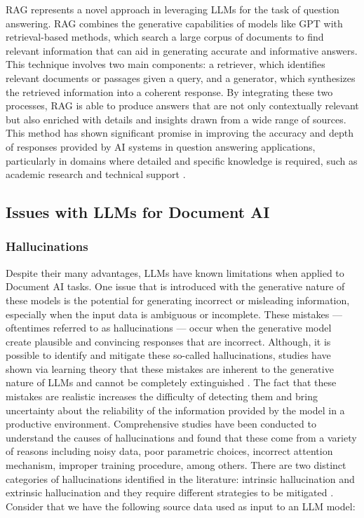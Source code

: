 \documentclass[english, 12pt, a4paper, elec, utf8, a-2b, online]{aaltothesis}
\begin{document}
\ac{RAG} represents a novel approach in leveraging \ac{LLM}s for the task of question answering.
\ac{RAG} combines the generative capabilities of models like GPT with retrieval-based methods, which search a large corpus of documents to find relevant information that can aid in generating accurate and informative answers.
This technique involves two main components: a retriever, which identifies relevant documents or passages given a query, and a generator, which synthesizes the retrieved information into a coherent response.
By integrating these two processes, RAG is able to produce answers that are not only contextually relevant but also enriched with details and insights drawn from a wide range of sources.
This method has shown significant promise in improving the accuracy and depth of responses provided by AI systems in question answering applications, particularly in domains where detailed and specific knowledge is required, such as academic research and technical support \cite{}.

\subsection{Issues with \ac{LLM}s for Document AI}

\subsubsection{Hallucinations}

Despite their many advantages, \ac{LLM}s have known limitations when applied to Document AI tasks.
One issue that is introduced with the generative nature of these models is the potential for generating incorrect or misleading information, especially when the input data is ambiguous or incomplete.
These mistakes --- oftentimes referred to as hallucinations --- occur when the generative model create plausible and convincing responses that are incorrect.
Although, it is possible to identify and mitigate these so-called hallucinations, studies have shown via learning theory that these mistakes are inherent to the generative nature of \ac{LLM}s and cannot be completely extinguished \cite{xu2024hallucination}.
The fact that these mistakes are realistic increases the difficulty of detecting them and bring uncertainty about the reliability of the information provided by the model in a productive environment.
Comprehensive studies have been conducted to understand the causes of hallucinations and found that these come from a variety of reasons including noisy data, poor
parametric choices, incorrect attention mechanism, improper training procedure, among others.
There are two distinct categories of hallucinations identified in the literature: intrinsic hallucination and extrinsic hallucination and they require different strategies to be mitigated \cite{survey_hallucination_natural_language_generation}.
Consider that we have the following source data used as input to an \ac{LLM} model:
\end{document}
